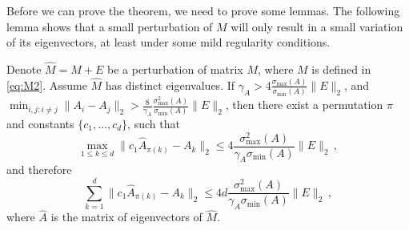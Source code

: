 Before we can prove the theorem, we need to prove some lemmas.
The following lemma shows that a small perturbation of $M$ will only result in a small variation of its eigenvectors, at least under some mild regularity conditions.
\begin{lemma}
\label{lem:eigenvectorvariation}
Denote $\widehat{M} = M+E$ be a perturbation of matrix $M$, where $M$ is defined in  \eqref{eq:M2}. 
Assume $\widehat{M}$ has distinct eigenvalues. 
If $\gamma_A > 4 \frac{\sigma_{\max}(A)}{\sigma_{\min}(A)}\|E\|_2$, and $\min_{i,j:i\neq j} \|A_i - A_j\|_2 > \frac{8}{\gamma_A}\frac{\sigma_{\max}^2(A)}{\sigma_{\min}(A) } \|E\|_2$, then there exist a permutation $\pi$ and constants $\{c_1,\ldots,c_d\}$, such that 
\[
\max_{1\le k\le d} \| c_1\widehat{A}_{\pi(k)} - A_k\|_2 \le 4  \frac{\sigma_{\max}^2(A)}{\gamma_A \sigma_{\min}(A) } \|E\|_2\,,
\]
and therefore
\[
\sum_{k=1}^{d}\| c_1\widehat{A}_{\pi(k)} - A_k\|_2 \le 4d  \frac{\sigma_{\max}^2(A)}{\gamma_A \sigma_{\min}(A)} \|E\|_2\,,
\]
where $\widehat{A}$ is the matrix of eigenvectors of $\widehat{M}$. 
\end{lemma}
